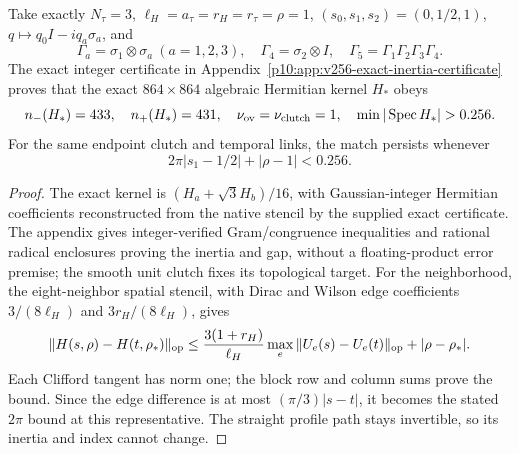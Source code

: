 \documentclass[12pt,a4paper]{article}
\begin{document}
\begin{theorem}
\label{p10:thm:v199-native-unit-component}
Take exactly \(N_\tau=3\),
\(\ell_H=a_\tau=r_H=r_\tau=\rho=1\), \((s_0,s_1,s_2)=(0,1/2,1)\),
\(q\mapsto q_0I-iq_a\sigma_a\), and
\[
 \Gamma_a=\sigma_1\otimes\sigma_a\ (a=1,2,3),\quad
 \Gamma_4=\sigma_2\otimes I,\quad
 \Gamma_5=\Gamma_1\Gamma_2\Gamma_3\Gamma_4.
\]
The exact integer certificate in
Appendix~\ref{p10:app:v256-exact-inertia-certificate} proves that the exact
\(864\times864\) algebraic Hermitian kernel \(H_*\) obeys
\begin{equation}
 n_-(H_*)=433,\quad n_+(H_*)=431,\quad
 \nu_{\rm ov}=\nu_{\rm clutch}=1,\quad
 \min|\operatorname{Spec}H_*|>0.256.
 \label{p10:eq:v199-unit-inertia}
\end{equation}
For the same endpoint clutch and temporal links, the match persists whenever
\begin{equation}
 2\pi|s_1-1/2|+|\rho-1|<0.256.
 \label{p10:eq:v199-unit-profile-tube}
\end{equation}
\end{theorem}
\begin{proof}
The exact kernel is \((H_a+\sqrt3H_b)/16\), with Gaussian-integer Hermitian
coefficients reconstructed from the native stencil by the supplied exact
certificate. The appendix gives integer-verified Gram/congruence inequalities
and rational radical enclosures proving the inertia and gap, without a
floating-product error premise;
the smooth unit clutch fixes its topological target.  For the neighborhood,
the eight-neighbor spatial stencil, with Dirac and Wilson edge coefficients
\(3/(8\ell_H)\) and \(3r_H/(8\ell_H)\), gives
\[
 \|H(s,\rho)-H(t,\rho_*)\|_{\rm op}
 \le\frac{3(1+r_H)}{\ell_H}\max_e\|U_e(s)-U_e(t)\|_{\rm op}
     +|\rho-\rho_*|.
\]
Each Clifford tangent has norm one; the block row and column sums prove the
bound.  Since the edge difference is at most \((\pi/3)|s-t|\), it becomes
the stated \(2\pi\) bound at this representative.  The straight profile
path stays invertible, so its inertia and index cannot change.
\end{proof}
\end{document}
